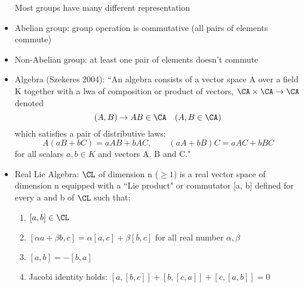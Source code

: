 \begin{itemize}
	Most groups have many different representation
    \item Abelian group: group operation is commutative (all pairs of elements
	commute)
    \item Non-Abelian group: at least one pair of elements doesn't commute
    \item Algebra (Szekeres 2004): ``An algebra consists of a vector space A
	over a field K together with a lwa of composition or product of vectors,
	$\CA \times \CA \rightarrow \CA $ denoted
	$$ (A, B) \rightarrow AB \in \CA \quad (A, B \in \CA)$$
	which satisfies a pair of distributive laws:
	$$ A(aB + bC) = aAB + bAC,  \qquad (aA + bB)C = aAC + bBC $$
	for all scalars $a, b  \in K$ and vectors A, B and C."
    \item Real Lie Algebra: $\CL$ of dimension n ($\ge 1$) is a real vector 
	space of dimension n equipped with a ``Lie product" or commutator [a, b]
	defined for every a and b of $\CL$ such that:
	\begin{enumerate}
	    \item $[a, b] \in \CL$
	    \item $[\alpha a + \beta b, c] = \alpha [a, c] + \beta [b, c]$ for 
		all real number $\alpha, \beta$
	    \item $[a, b] = -[b, a]$
	    \item Jacobi identity holds:
		$[a, [b, c]] + [b, [c, a]] + [c, [a, b]] = 0$
	\end{enumerate}
\end{itemize}

